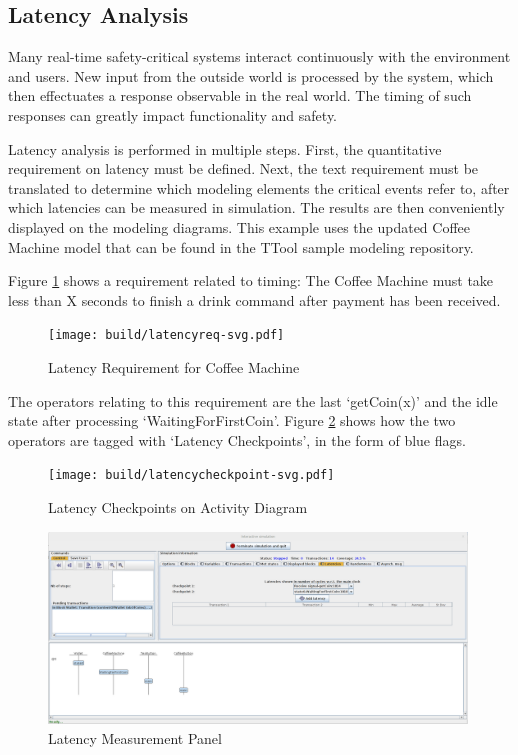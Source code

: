 \documentclass[12pt]{article}
\begin{document}
\subsection{Latency Analysis}


Many real-time safety-critical systems interact continuously with the environment and users. New input from the outside world is processed by the system, which then effectuates a response observable in the real world. The timing of such responses can greatly impact functionality and safety.

Latency analysis is performed in multiple steps. First, the quantitative requirement on latency must be defined. Next, the text requirement must be translated to determine which modeling elements the critical events refer to, after which latencies can be measured in simulation. The results are then conveniently displayed on the modeling diagrams. This example uses the updated Coffee Machine model that can be found in the TTool sample modeling repository.

Figure \ref{fig:latencyreq} shows a requirement related to timing: The Coffee Machine must take less than X seconds to finish a drink command after payment has been received. 

\begin{figure}[htbp]
\centering
\texttt{[image: build/latencyreq-svg.pdf]}
\caption{Latency Requirement for Coffee Machine} \label{fig:latencyreq}
\end{figure}

The operators relating to this requirement are the last `getCoin(x)' and the idle state after processing `WaitingForFirstCoin'. Figure \ref{fig:latencycheckpoint} shows how the two operators are tagged with `Latency Checkpoints', in the form of blue flags.

\begin{figure}[htbp]
\centering
\texttt{[image: build/latencycheckpoint-svg.pdf]}
\caption{Latency Checkpoints on Activity Diagram} \label{fig:latencycheckpoint}
\end{figure}


\begin{figure}[htbp]
\centering
\includegraphics[width=0.99\textwidth]{fig/latencymeasure.png}
\caption{Latency Measurement Panel} \label{fig:latencymeasurement}
\end{figure}
\end{document}
